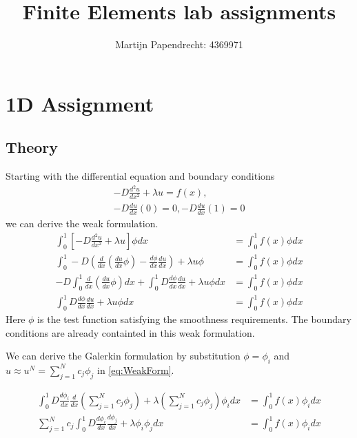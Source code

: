 \documentclass[10pt,a4paper]{article}
\title{Finite Elements lab assignments}
\author{Martijn Papendrecht: 4369971}
\begin{document}
\maketitle
\newpage
\tableofcontents
\newpage
\section{1D Assignment}
\subsection{Theory}
Starting with the differential equation and boundary conditions
\begin{equation}
\begin{split}
-D \frac{d^2u}{dx^2} + \lambda u = f(x), \\
-D \frac{du}{dx}(0) = 0, -D \frac{du}{dx}(1)=0
\end{split}
\end{equation}
we can derive the weak formulation. 
\begin{equation} 
\label{eq:WeakForm}
\begin{split}
\int_0^1 \left[ -D   \frac{d^2 u}{dx^2} + \lambda u \right] \phi dx &= \int_0^1 f(x) \phi dx \\
\int_0^1  -D \left( \frac{d}{dx} \left( \frac{du}{dx} \phi \right) - \frac{d\phi}{dx} \frac{du}{dx} \right) + \lambda u \phi &= \int_0^1 f(x) \phi dx \\
-D \int_0^1 \frac{d}{dx} \left( \frac{du}{dx} \phi \right) dx + \int_0^1 D \frac{d\phi}{dx}\frac{du}{dx} + \lambda u \phi dx &= \int_0^1 f(x) \phi dx \\
\int_0^1 D \frac{d\phi}{dx} \frac{du}{dx} + \lambda u \phi dx &= \int_0^1 f(x) \phi dx
\end{split}
\end{equation}
Here $\phi$ is the test function satisfying the smoothness requirements. 
The boundary conditions are already containted in this weak formulation.

We can derive the Galerkin formulation by substitution $\phi = \phi_i$ and $u \approx u^N = \sum_{j=1}^N c_j \phi_j$ in \cref{eq:WeakForm}.

\begin{equation} 
\begin{split}
\int_0^1 D \frac{d\phi_i}{dx} \frac{d}{dx}\left( \sum_{j=1}^N c_j \phi_j \right) + \lambda \left( \sum_{j=1}^N c_j \phi_j \right) \phi_i dx &= \int_0^1 f(x) \phi_i dx \\
\sum_{j=1}^N c_j \int_0^1 D \frac{d \phi_i}{dx} \frac{d \phi_j}{dx} + \lambda \phi_i \phi_j dx &= \int_0^1 f(x) \phi_i dx
\end{split}
\end{equation}
\end{document}
